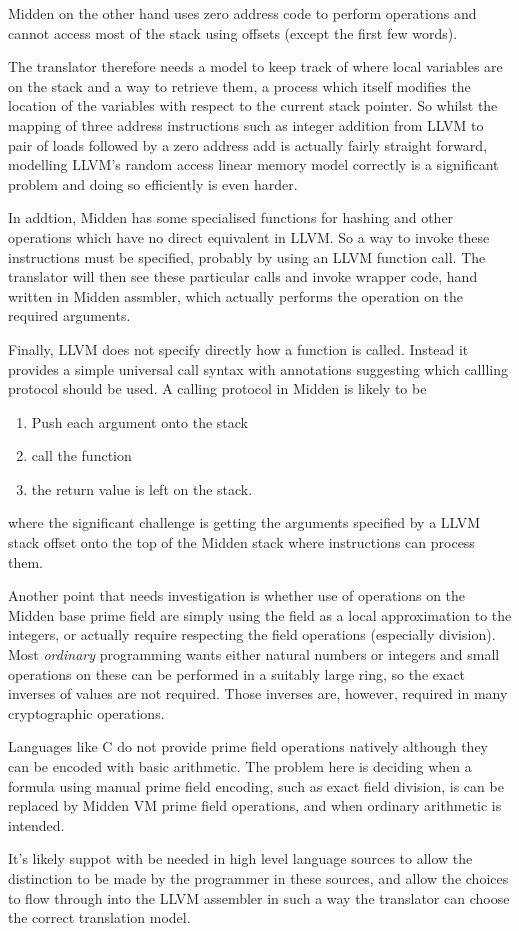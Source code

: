 \documentclass{article}
\begin{document}
Midden on the other hand uses zero address code to perform 
operations and cannot access most of the stack using offsets
(except the first few words).

The translator therefore needs a model to keep track of where
local variables are on the stack and a way to retrieve them,
a process which itself modifies the location of the variables with
respect to the current stack pointer. So whilst the mapping
of three address instructions such as integer addition from LLVM
to pair of loads followed by a zero address add is actually 
fairly straight forward, modelling LLVM's random access linear memory
model correctly is a significant problem and doing so efficiently
is even harder.

In addtion, Midden has some specialised functions for hashing and
other operations which have no direct equivalent in LLVM. So a way
to invoke these instructions must be specified, probably by
using an LLVM function call. The translator will then see these
particular calls and invoke wrapper code, hand written in Midden
assmbler, which actually performs the operation on the required
arguments.

Finally, LLVM does not specify directly how a function is called.
Instead it provides a simple universal call syntax with annotations
suggesting which callling protocol should be used. A calling protocol
in Midden is likely to be
\begin{enumerate}
\item Push each argument onto the stack
\item call the function
\item the return value is left on the stack.
\end{enumerate}

where the significant challenge is getting the arguments
specified by a LLVM stack offset onto the top of the Midden
stack where instructions can process them.

Another point that needs investigation is whether use of operations
on the Midden base prime field are simply using the field as a local
approximation to the integers, or actually require respecting the
field operations (especially division). Most {\em ordinary} programming
wants either natural numbers or integers and small operations on these
can be performed in a suitably large ring, so the exact inverses of
values are not required. Those inverses are, however, required
in many cryptographic operations.

Languages like C do not provide prime field operations natively
although they can be encoded with basic arithmetic. The problem here
is deciding when a formula using manual prime field encoding,
such as exact field division, is can be replaced by Midden VM
prime field operations, and when ordinary arithmetic is intended.

It's likely suppot with be needed in high level language sources
to allow the distinction to be made by the programmer in these 
sources, and allow the choices to flow through into the LLVM
assembler in such a way the translator can choose the correct
translation model.
\end{document}
